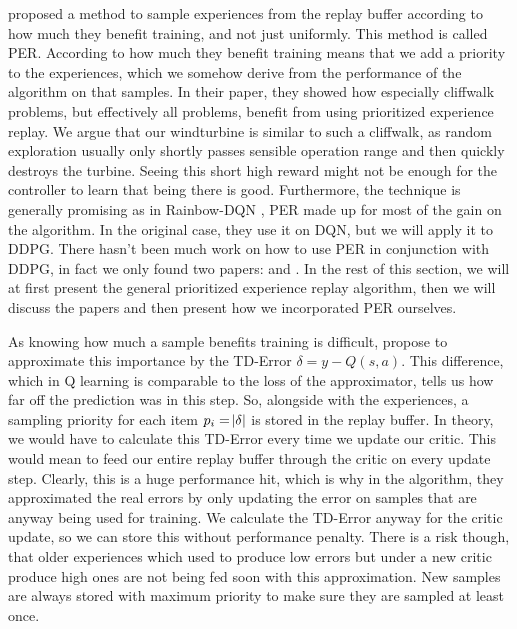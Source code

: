 \documentclass[hyperref,final,beleg]{cgvpub}
\begin{document}
\cite{schaulPrioritizedExperienceReplay2016} proposed a method to sample experiences from the replay buffer according to how much they benefit training, and not just uniformly. This method is called \ac{PER}. According to how much they benefit training means that we add a priority to the experiences, which we somehow derive from the performance of the algorithm on that samples. In their paper, they showed how especially cliffwalk problems, but effectively all problems, benefit from using prioritized experience replay. We argue that our windturbine is similar to such a cliffwalk, as random exploration usually only shortly passes sensible operation range and then quickly destroys the turbine. Seeing this short high reward might not be enough for the controller to learn that being there is good. Furthermore, the technique is generally promising as in Rainbow-\ac{DQN} \cite{hesselRainbowCombiningImprovements2017}, \ac{PER} made up for most of the gain on the algorithm. In the original case, they use it on \ac{DQN}, but we will apply it to \ac{DDPG}. There hasn't been much work on how to use \ac{PER} in conjunction with \ac{DDPG}, in fact we only found two papers: \cite{houImprovingDDPGPrioritized} and \cite{zhaExperienceReplayOptimization2019}. In the rest of this section, we will at first present the general prioritized experience replay algorithm, then we will discuss the papers and then present how we incorporated \ac{PER} ourselves.

As knowing how much a sample benefits training is difficult, \cite{schaulPrioritizedExperienceReplay2016} propose to approximate this importance by the \ac{TD-Error} $\delta = y - Q(s, a)$. This difference, which in Q learning is comparable to the loss of the approximator, tells us how far off the prediction was in this step. So, alongside with the experiences, a sampling priority for each item $p_i = \abs{\delta}$ is stored in the replay buffer. In theory, we would have to calculate this \ac{TD-Error} every time we update our critic. This would mean to feed our entire replay buffer through the critic on every update step. Clearly, this is a huge performance hit, which is why in the algorithm, they approximated the real errors by only updating the error on samples that are anyway being used for training. We calculate the \ac{TD-Error} anyway for the critic update, so we can store this without performance penalty. There is a risk though, that older experiences which used to produce low errors but under a new critic produce high ones are not being fed soon with this approximation. New samples are always stored with maximum priority to make sure they are sampled at least once.
\end{document}
